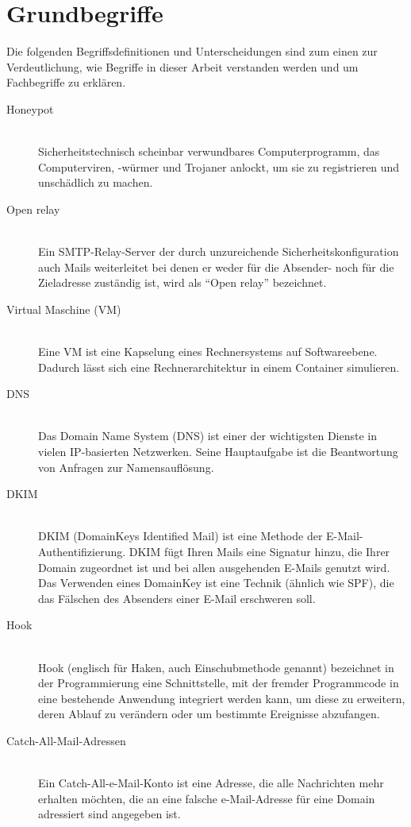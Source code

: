 \documentclass[a4paper,11pt,singlespacing]{article}
\begin{document}
\section{Grundbegriffe}\label{sec:Grundbegriffe}
	Die folgenden Begriffsdefinitionen und Unterscheidungen sind zum einen zur Verdeutlichung, wie Begriffe in dieser Arbeit verstanden werden und um Fachbegriffe zu erklären.
	
	\begin{description}
	\item[Honeypot\label{itm:Honeypot}]\hfill \\
		Sicherheitstechnisch scheinbar verwundbares Computerprogramm, das Computerviren, -würmer und Trojaner anlockt, um sie zu registrieren und unschädlich zu machen.\cite{Honeypot}
	\item[Open relay\label{itm:OpenRelay}]\hfill \\
		Ein SMTP-Relay-Server der durch unzureichende Sicherheitskonfiguration auch Mails weiterleitet bei denen er weder für die Absender- noch für die Zieladresse zuständig ist, wird als "`Open relay"' bezeichnet.\cite{SMTP-Relay-Server}
	\item[Virtual Maschine (VM)\label{itm:VirtualMaschine}]\hfill \\
		Eine VM ist eine Kapselung eines Rechnersystems auf Softwareebene. Dadurch lässt sich eine Rechnerarchitektur in einem Container simulieren. \cite{}
	\item[DNS\label{itm:DNS}]\hfill \\
		Das Domain Name System (DNS) ist einer der wichtigsten Dienste in vielen IP-basierten Netzwerken. Seine Hauptaufgabe ist die Beantwortung von Anfragen zur Namensauflösung.\cite{DNS}
	\item[DKIM\label{itm:DKIM}]\hfill \\
		DKIM (DomainKeys Identified Mail) ist eine Methode der E-Mail-Authentifizierung. DKIM fügt Ihren Mails eine Signatur hinzu, die Ihrer Domain zugeordnet ist und bei allen ausgehenden E-Mails genutzt wird. Das Verwenden eines DomainKey ist eine Technik (ähnlich wie SPF), die das Fälschen des Absenders einer E-Mail erschweren soll.\cite{DKIM}
	\item[Hook\label{itm:Hook}]\hfill \\
		Hook (englisch für Haken, auch Einschubmethode genannt) bezeichnet in der Programmierung eine Schnittstelle, mit der fremder Programmcode in eine bestehende Anwendung integriert werden kann, um diese zu erweitern, deren Ablauf zu verändern oder um bestimmte Ereignisse abzufangen.\cite{Hook}
	\item[Catch-All-Mail-Adressen\label{itm:Catch-All-Mail}]\hfill \\
		Ein Catch-All-e-Mail-Konto ist eine Adresse, die alle Nachrichten mehr erhalten möchten, die an eine falsche e-Mail-Adresse für eine Domain adressiert sind angegeben ist.\cite{Catch-All-Mail}
	\end{description}
\end{document}
